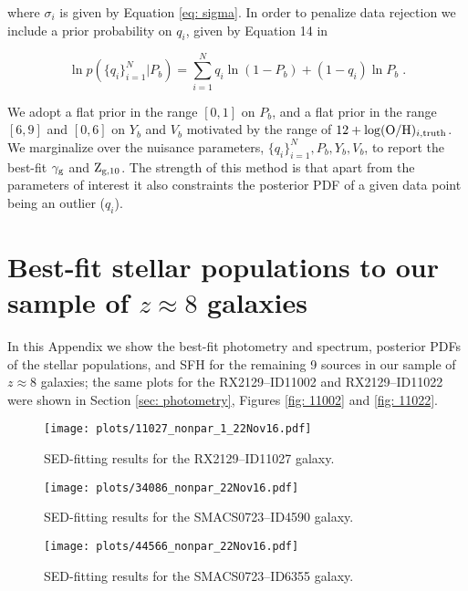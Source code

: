 \documentclass[twocolumn]{aastex631}
\newcommand\titlelowercase[1]{\texorpdfstring{\lowercase{#1}}{#1}}
\begin{document}
\noindent
where $\sigma_i$ is given by Equation \ref{eq: sigma}. In order to penalize data rejection we include a prior probability on $q_i$, given by Equation 14 in \cite{hogg+2010}

\begin{equation}
    \ln p(\big\{q_i\big\}_{i=1}^N \big| P_b) = \sum_{i=1}^{N} q_i \ln(1-P_b) + (1-q_i) \ln P_b \;.
\end{equation}

\noindent
We adopt a flat prior in the range $[0,1]$ on $P_b$, and a flat prior in the range $[6,9]$ and $[0,6]$ on $Y_b$ and $V_b$ motivated by the range of $12 + \log(\textnormal{O/H})_{i, \textnormal{\scriptsize truth}}$. We marginalize over the nuisance parameters, $\{q_i\}_{i=1}^N, P_b, Y_b, V_b$, to report the best-fit $\gamma_{\textnormal{\scriptsize g}}$ and $\textnormal{Z}_{\textnormal{\scriptsize g,10}}$. The strength of this method is that apart from the parameters of interest it also constraints the posterior PDF of a given data point being an outlier ($q_i$).

\section{Best-fit stellar populations to our sample of \titlelowercase{$z \approx 8$} galaxies} \label{app: prospector}

In this Appendix we show the best-fit photometry and spectrum, posterior PDFs of the stellar populations, and SFH for the remaining 9 sources in our sample of $z \approx 8$ galaxies; the same plots for the RX2129--ID11002 and RX2129--ID11022 were shown in Section \ref{sec: photometry}, Figures \ref{fig: 11002} and \ref{fig: 11022}.

\begin{figure*}[hb]
    \centering
    \texttt{[image: plots/11027\_nonpar\_1\_22Nov16.pdf]}
    \caption{SED-fitting results for the RX2129--ID11027 galaxy.}
    \label{fig: 11027}
\end{figure*}

\begin{figure*}
    \centering
    \texttt{[image: plots/34086\_nonpar\_22Nov16.pdf]}
    \caption{SED-fitting results for the SMACS0723--ID4590 galaxy.}
    \label{fig: 4590}
\end{figure*}

\begin{figure*}
    \centering
    \texttt{[image: plots/44566\_nonpar\_22Nov16.pdf]}
    \caption{SED-fitting results for the SMACS0723--ID6355 galaxy.}
    \label{fig: 6355}
\end{figure*}
\end{document}

